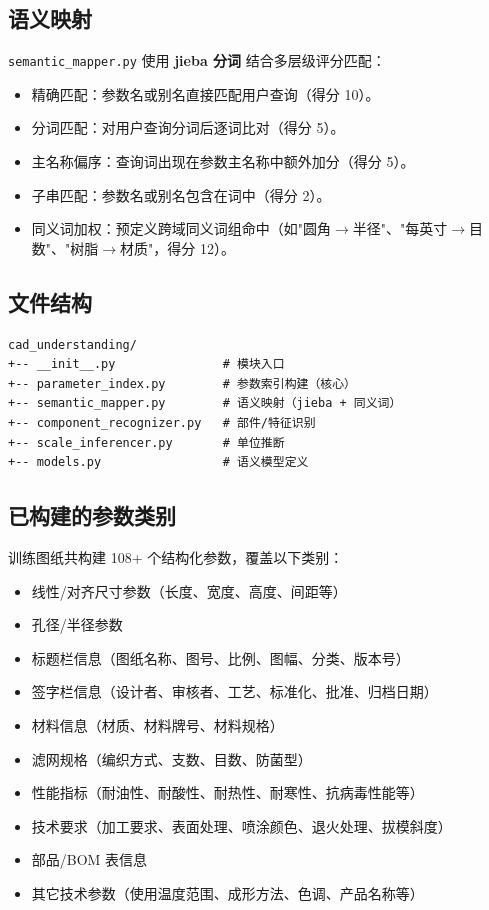 \documentclass[11pt,a4paper]{article}
\begin{document}
\subsection{语义映射}

\texttt{semantic\_mapper.py} 使用 \textbf{jieba 分词} 结合多层级评分匹配：

\begin{itemize}[nosep]
  \item 精确匹配：参数名或别名直接匹配用户查询（得分 10）。
  \item 分词匹配：对用户查询分词后逐词比对（得分 5）。
  \item 主名称偏序：查询词出现在参数主名称中额外加分（得分 5）。
  \item 子串匹配：参数名或别名包含在词中（得分 2）。
  \item 同义词加权：预定义跨域同义词组命中（如"圆角$\rightarrow$半径"、"每英寸$\rightarrow$目数"、"树脂$\rightarrow$材质"，得分 12）。
\end{itemize}

\subsection{文件结构}

\begin{lstlisting}[language={},frame=single]
cad_understanding/
+-- __init__.py               # 模块入口
+-- parameter_index.py        # 参数索引构建（核心）
+-- semantic_mapper.py        # 语义映射（jieba + 同义词）
+-- component_recognizer.py   # 部件/特征识别
+-- scale_inferencer.py       # 单位推断
+-- models.py                 # 语义模型定义
\end{lstlisting}

\subsection{已构建的参数类别}

训练图纸共构建 108+ 个结构化参数，覆盖以下类别：

\begin{itemize}[nosep]
  \item 线性/对齐尺寸参数（长度、宽度、高度、间距等）
  \item 孔径/半径参数
  \item 标题栏信息（图纸名称、图号、比例、图幅、分类、版本号）
  \item 签字栏信息（设计者、审核者、工艺、标准化、批准、归档日期）
  \item 材料信息（材质、材料牌号、材料规格）
  \item 滤网规格（编织方式、支数、目数、防菌型）
  \item 性能指标（耐油性、耐酸性、耐热性、耐寒性、抗病毒性能等）
  \item 技术要求（加工要求、表面处理、喷涂颜色、退火处理、拔模斜度）
  \item 部品/BOM 表信息
  \item 其它技术参数（使用温度范围、成形方法、色调、产品名称等）
\end{itemize}
\end{document}
